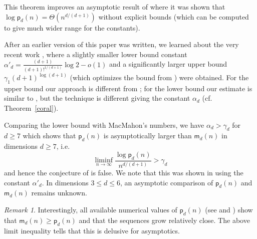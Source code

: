\documentclass[12pt]{amsart}
\newtheorem{corollary}[theorem]{Corollary}
\theoremstyle{definition}
\theoremstyle{remark}
\newtheorem{remark}{Remark}
\begin{document}
This theorem %
improves an asymptotic result of \cite{bhatia} where it was shown that $\log \mathsf{p}_{d}(n) = \Theta(n^{d/(d+1)})$ without explicit bounds (which can be computed to give much wider range for the constants). 

After an earlier version of 
this paper was written, we learned about the very recent work \cite{dai},
where a slightly smaller lower bound constant $\alpha'_d = \frac{(d+1)}{(d+1)!^{1/(d+1)}} \log 2 - o(1)$ and 
a significantly larger upper bound  $\gamma_1 (d+1)^{\log(d+1)}$ %
(which optimizes the bound from \cite{bhatia}) were obtained. %
For the upper bound %
our approach
is different from \cite{bhatia, dai}; for the lower bound 
our estimate %
is similar to \cite{dai}, but the technique is different giving the constant $\alpha_d$ (cf. Theorem~\ref{coral}).

Comparing the lower bound with MacMahon's numbers, we have $\alpha_d > \gamma_d$ for $d \ge 7$  which %
shows %
that {$\mathsf{p}_d(n)$ is asymptotically larger than $\mathsf{m}_d(n)$ in dimensions $d \ge 7$}, i.e. %
$$%
\liminf_{n \to \infty} 
\frac{\log \mathsf{p}_{d}(n)}{n^{d/(d+1) }} > \gamma_d %
$$%
and hence the conjecture of \cite{bgp} is false.
We note that this was shown in \cite{dai} using the constant $\alpha'_d$. %
In dimensions $3 \le d \le 6$, an asymptotic comparison of $\mathsf{p}_d(n)$ and $\mathsf{m}_d(n)$ remains unknown. 


\begin{remark}
Interestingly, all available numerical values of $\mathsf{p}_d(n)$ (see \cite{atkin, knuth, boltzmann, ekhad} and \cite[A000293, A000294]{oeis}) show that $\mathsf{m}_d(n) \ge \mathsf{p}_d(n)$ and that the sequences grow relatively close. The above limit inequality %
tells that this is delusive for asymptotics. 
\end{remark}
\end{document}
